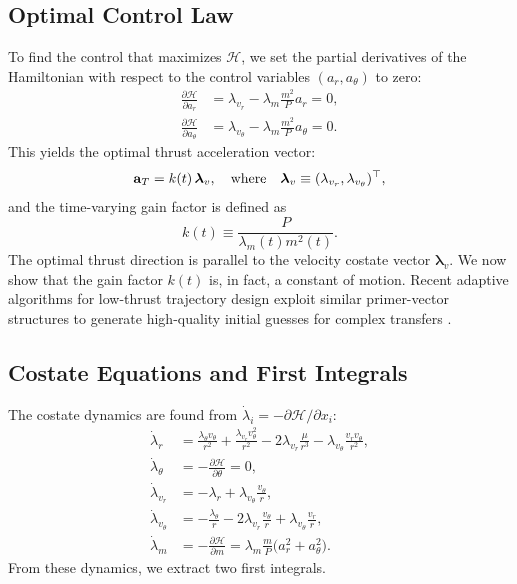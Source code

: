 \documentclass[journal,a4paper]{IEEEtran}
\begin{document}
\subsection{Optimal Control Law}
To find the control that maximizes $\mathcal{H}$, we set the partial derivatives of the Hamiltonian with respect to the control variables $(a_r, a_\theta)$ to zero:
\begin{subequations}
\begin{align}
    \frac{\partial\mathcal{H}}{\partial a_r} &= \lambda_{v_r} - \lambda_m \frac{m^2}{P} a_r = 0, \\
    \frac{\partial\mathcal{H}}{\partial a_\theta} &= \lambda_{v_\theta} - \lambda_m \frac{m^2}{P} a_\theta = 0.
\end{align}
\end{subequations}
This yields the optimal thrust acceleration vector:
\begin{equation}
  {\bf a}_T = k(t)\,\boldsymbol\lambda_v, \quad \text{where} \quad \boldsymbol\lambda_v \equiv (\lambda_{v_r},\lambda_{v_\theta})^\top,
  \label{eq:ThrustLaw_prelim}
\end{equation}
and the time-varying gain factor is defined as
\begin{equation}
    k(t) \equiv \frac{P}{\lambda_m(t) m^2(t)}.
    \label{eq:GainFactorDef}
\end{equation}
The optimal thrust direction is parallel to the velocity costate vector $\boldsymbol\lambda_v$. We now show that the gain factor $k(t)$ is, in fact, a constant of motion.
Recent adaptive algorithms for low-thrust trajectory design exploit similar primer-vector structures to generate high-quality initial guesses for complex transfers \cite{PinoHowell2020}.

\subsection{Costate Equations and First Integrals}
The costate dynamics are found from $\dot\lambda_i = -\partial\mathcal{H}/\partial x_i$:
\begin{subequations}\label{eq:CostateDyn}
\begin{align}
  \dot\lambda_r &=
      \frac{\lambda_\theta v_\theta}{r^{2}}
      +\frac{\lambda_{v_r} v_\theta^{2}}{r^{2}}
      -2\lambda_{v_r}\frac{\mu}{r^{3}}
      -\lambda_{v_\theta}\frac{v_r v_\theta}{r^{2}},
      \label{eq:lam_r}\\[4pt]
  \dot\lambda_\theta &= -\frac{\partial\mathcal{H}}{\partial\theta} = 0,
      \label{eq:lam_theta_deriv}\\[4pt]
  \dot\lambda_{v_r} &=
      -\lambda_r + \lambda_{v_\theta}\frac{v_\theta}{r},
      \label{eq:lam_vr}\\[4pt]
  \dot\lambda_{v_\theta} &=
      -\frac{\lambda_\theta}{r}
      -2\lambda_{v_r}\frac{v_\theta}{r}
      +\lambda_{v_\theta}\frac{v_r}{r},
      \label{eq:lam_vt}\\[4pt]
  \dot\lambda_m &= -\frac{\partial\mathcal{H}}{\partial m} =
      \lambda_m \frac{m}{P}\bigl(a_r^{2}+a_\theta^{2}\bigr).
      \label{eq:lam_m}
\end{align}
\end{subequations}
From these dynamics, we extract two first integrals.
\end{document}
